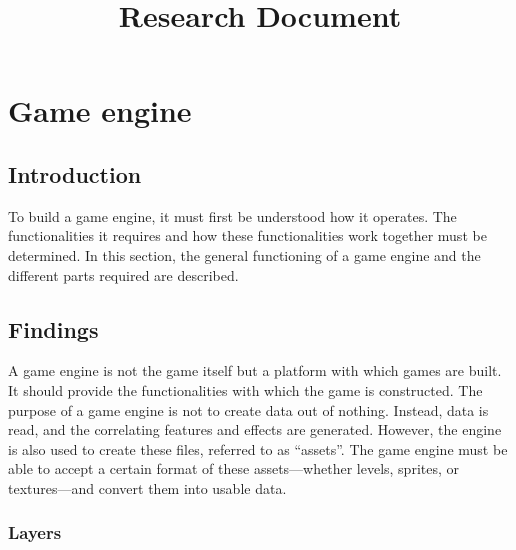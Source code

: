\documentclass{projdoc}
\title{Research Document}
\begin{document}
\tablestables
\newpage


\section{Game engine}

\subsection{Introduction}

To build a game engine, it must first be understood how it operates. The
functionalities it requires and how these functionalities work together must be
determined. In this section, the general functioning of a game engine and the
different parts required are described.

\subsection{Findings}

A game engine is not the game itself but a platform with which games are built. It
should provide the functionalities with which the game is constructed. The purpose of
a game engine is not to create data out of nothing. Instead, data is read, and the
correlating features and effects are generated. However, the engine is also used to
create these files, referred to as ``assets''. The game engine must be able to accept
a certain format of these assets---whether levels, sprites, or textures---and convert
them into usable data.

\subsubsection{Layers}
\end{document}
